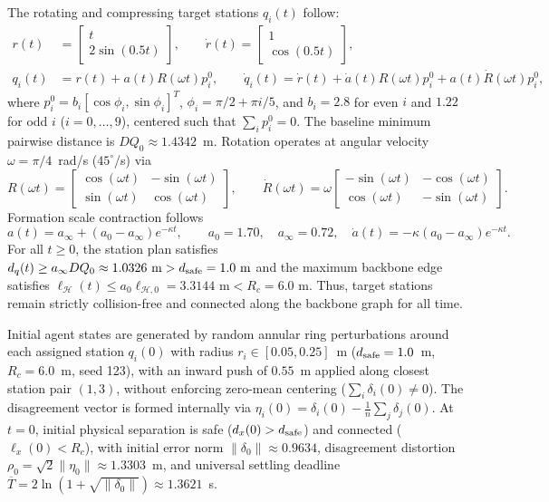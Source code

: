 \documentclass[10pt]{article}
\begin{document}
The rotating and compressing target stations $q_i(t)$ follow:
\begin{align*}
r(t) &= \begin{bmatrix} t \\ 2 \sin(0.5 t) \end{bmatrix}, \qquad
\dot r(t) = \begin{bmatrix} 1 \\ \cos(0.5 t) \end{bmatrix}, \\
q_i(t) &= r(t) + a(t) R(\omega t) p_i^0, \qquad
\dot q_i(t) = \dot r(t) + \dot a(t) R(\omega t) p_i^0 + a(t) \dot R(\omega t) p_i^0,
\end{align*}
where $p_i^0 = b_i [\cos\phi_i, \sin\phi_i]^T$, $\phi_i = \pi/2 + \pi i/5$, and $b_i = 2.8$ for even $i$ and $1.22$ for odd $i$ ($i=0,\ldots,9$), centered such that $\sum_i p_i^0 = 0$. The baseline minimum pairwise distance is $DQ_0 \approx 1.4342$~m. Rotation operates at angular velocity $\omega = \pi/4$~rad/s ($45^\circ$/s) via
\[
R(\omega t) = \begin{bmatrix} \cos(\omega t) & -\sin(\omega t) \\ \sin(\omega t) & \cos(\omega t) \end{bmatrix}, \qquad
\dot R(\omega t) = \omega \begin{bmatrix} -\sin(\omega t) & -\cos(\omega t) \\ \cos(\omega t) & -\sin(\omega t) \end{bmatrix}.
\]
Formation scale contraction follows
\[
a(t) = a_\infty + (a_0 - a_\infty)e^{-\kappa t}, \qquad a_0 = 1.70, \quad a_\infty = 0.72, \quad \dot a(t) = -\kappa(a_0 - a_\infty)e^{-\kappa t}.
\]
For all $t \ge 0$, the station plan satisfies $d_q(t) \ge a_\infty DQ_0 \approx 1.0326\text{ m} > d_{\rm safe} = 1.0\text{ m}$ and the maximum backbone edge satisfies $\ell_{\mathcal{H}}(t) \le a_0 \ell_{\mathcal{H},0} = 3.3144\text{ m} < R_c = 6.0\text{ m}$. Thus, target stations remain strictly collision-free and connected along the backbone graph for all time.

Initial agent states are generated by random annular ring perturbations around each assigned station $q_i(0)$ with radius $r_i \in [0.05, 0.25]$~m ($d_{\rm safe} = 1.0$~m, $R_c = 6.0$~m, seed 123), with an inward push of $0.55$~m applied along closest station pair $(1,3)$, without enforcing zero-mean centering ($\sum_i \delta_i(0) \neq 0$). The disagreement vector is formed internally via $\eta_i(0) = \delta_i(0) - \frac{1}{n}\sum_j \delta_j(0)$. At $t=0$, initial physical separation is safe ($d_x(0) > d_{\rm safe}$) and connected ($\ell_x(0) < R_c$), with initial error norm $\|\delta_0\| \approx 0.9634$, disagreement distortion $\rho_0 = \sqrt{2}\|\eta_0\| \approx 1.3303$~m, and universal settling deadline $\overline T = 2\ln(1+\sqrt{\|\delta_0\|}) \approx 1.3621$~s.
\end{document}
